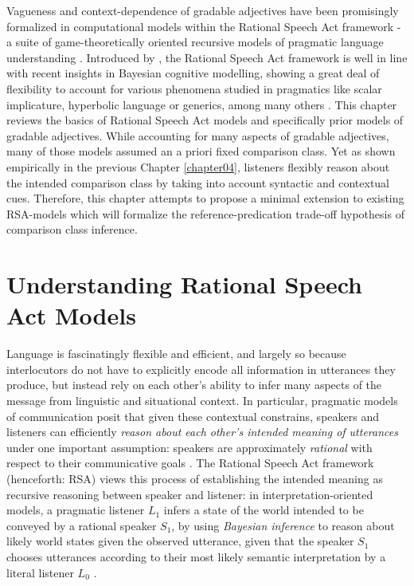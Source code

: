 Vagueness and context-dependence of gradable adjectives have been promisingly formalized in computational models within the Rational Speech Act framework -  a suite of game-theoretically oriented recursive models of pragmatic language understanding \parencite[e.g.,][]{goodman2016, lassiter2017adjectival, tessler2017warm}. Introduced by \textcite{frank2012predicting}, the Rational Speech Act framework is well in line with recent insights in Bayesian cognitive modelling, showing a great deal of flexibility to account for various phenomena studied in pragmatics like scalar implicature, hyperbolic language or generics, among many others \parencite[e.g.,][]{tenenbaum2011grow, problang}. This chapter reviews the basics of Rational Speech Act models and specifically prior models of gradable adjectives. While accounting for many aspects of gradable adjectives, many of those models assumed an a priori fixed comparison class. Yet as shown empirically in the previous Chapter \ref{chapter04}, listeners flexibly reason about the intended comparison class by taking into account syntactic and contextual cues. Therefore, this chapter attempts to propose a minimal extension to existing RSA-models which will formalize the reference-predication trade-off hypothesis of comparison class inference.%
  
\section{Understanding Rational Speech Act Models}
\label{intro-rsa}
Language is fascinatingly flexible and efficient, and largely so because interlocutors do not have to explicitly encode all information in utterances they produce, but instead rely on each other's ability to infer many aspects of the message from linguistic and situational context. In particular, pragmatic models of communication posit that given these contextual constrains, speakers and listeners can efficiently \emph{reason about each other's intended meaning of utterances} under one important assumption: speakers are approximately \emph{rational} with respect to their communicative goals \parencite{frank2012predicting}. The Rational Speech Act framework (henceforth: RSA) views this process of establishing the intended meaning as recursive reasoning between speaker and listener: in interpretation-oriented models, a pragmatic listener $L_1$ infers a state of the world intended to be conveyed by a rational speaker $S_1$, by using \emph{Bayesian inference} to reason about likely world states given the observed utterance, given that the speaker $S_1$ chooses utterances according to their most likely semantic interpretation by a literal listener $L_0$ \parencite{problang}.  


